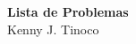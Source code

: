 \begin{center}
{
    \textbf{\Large Lista de Problemas} \vspace{5mm} \\
    {\large Kenny J. Tinoco} \vspace{3mm}
}
\end{center}

\thispagestyle{first-page-style}
